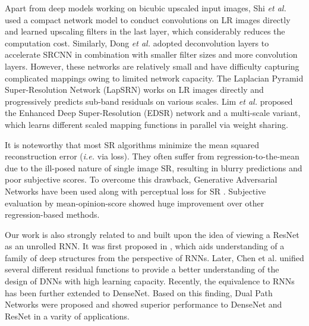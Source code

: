 \documentclass[10pt,twocolumn,letterpaper]{article}
\begin{document}
Apart from deep models working on bicubic upscaled input images, Shi \emph{et al.} \cite{shi2016real} used a compact network model to conduct convolutions on LR images directly and learned  upscaling filters in the last layer, which considerably reduces the computation cost.  Similarly, Dong \emph{et al.} \cite{dong2016accelerating} adopted deconvolution layers to accelerate SRCNN in combination with smaller filter sizes and more convolution layers. 
However, these networks are relatively small and have difficulty capturing complicated mappings owing to limited network capacity.
The Laplacian Pyramid Super-Resolution Network (LapSRN) \cite{lai2017deep} works on LR images directly and progressively predicts sub-band residuals on various scales.  
Lim \emph{et al.} \cite{lim2017enhanced} proposed the Enhanced Deep Super-Resolution (EDSR) network and a multi-scale variant, which learns different scaled mapping functions in parallel via weight sharing.  

It is noteworthy that most SR algorithms minimize the mean squared reconstruction error (\emph{i.e.} via  loss).   They often suffer from regression-to-the-mean due to the ill-posed nature of single image SR, resulting in blurry predictions and poor subjective scores.  To overcome this drawback, Generative Adversarial Networks have been used along with perceptual loss for SR \cite{ledig2016photo,sajjadi2017enhancenet}. Subjective evaluation by mean-opinion-score showed huge improvement over other regression-based methods.

Our work is also strongly related to and built upon the idea of viewing a ResNet as an unrolled RNN.  It was first proposed in \cite{liao2016bridging}, which aids understanding of a family of deep structures from the perspective of RNNs.   Later, Chen et al. \cite{yunpeng2017sharing} unified several different residual functions to provide a better understanding of the design of DNNs with high learning capacity.  Recently,  the equivalence to RNNs has been further extended to DenseNet.  Based on this finding, Dual Path Networks \cite{chen2017dual} were proposed and showed superior performance to DenseNet and ResNet in a varity of applications. 
\end{document}
